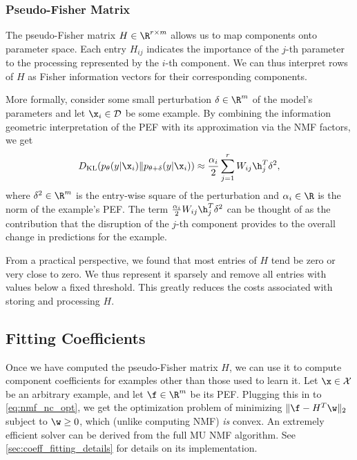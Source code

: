 \documentclass[dvipsnames]{article}
\begin{document}

\subsubsection{Pseudo-Fisher Matrix}
The pseudo-Fisher matrix $H \in \R^{r\times m}$ allows us to map components onto parameter space.
Each entry $H_{ij}$ indicates the importance of the $j$-th parameter to the processing represented by the $i$-th component.
We can thus interpret rows of $H$ as Fisher information vectors for their corresponding components.

More formally, consider some small perturbation $\delta \in \R^m$ of the model's parameters and let $\x_i \in \mathcal D$ be some example.
By combining the information geometric interpretation of the PEF with its approximation via the NMF factors, we get
\begin{equation}\label{eq:pef_nmf_info_geom}
D_\mathrm{KL}(p_\theta(y|\x_i) \| p_{\theta+\delta}(y|\x_i)) \approx \frac{\alpha_i}2 \sum_{j=1}^r W_{ij}\h_j^T \delta^2,
\end{equation}
where $\delta^2 \in \R^m$ is the entry-wise square of the perturbation and $\alpha_i \in \R$ is the norm of the example's PEF.
The term $\frac{\alpha_i}2 W_{ij}\h_j^T \delta^2$ can be thought of as the contribution that the disruption of the $j$-th component provides to the overall change in predictions for the example.

From a practical perspective, we found that most entries of $H$ tend be zero or very close to zero.
We thus represent it sparsely and remove all entries with values below a fixed threshold.
This greatly reduces the costs associated with storing and processing $H$.

\subsection{Fitting Coefficients}\label{sec:fitting_coeffs}
Once we have computed the pseudo-Fisher matrix $H$, we can use it to compute component coefficients for examples other than those used to learn it.
Let $\x\in\mathcal X$ be an arbitrary example, and let $\f\in\R^m$ be its PEF.
Plugging this in to \eqref{eq:nmf_nc_opt}, we get the optimization problem of minimizing $\|\f - H^T\w\|_2$ subject to $ \w \geq 0$,
which (unlike computing NMF) \textit{is} convex.
An extremely efficient solver can be derived from the full MU NMF algorithm.
See \cref{sec:coeff_fitting_details} for details on its implementation.
\end{document}
